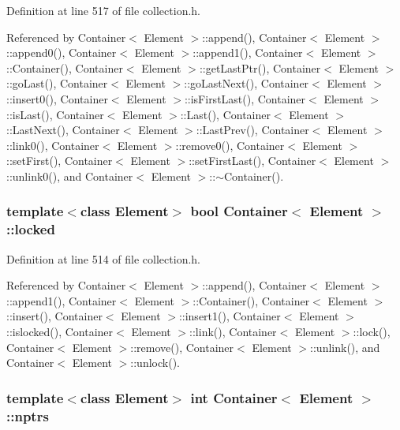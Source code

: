 Definition at line 517 of file collection.h.

Referenced by Container$<$ Element $>$::append(), Container$<$ Element $>$::append0(), Container$<$ Element $>$::append1(), Container$<$ Element $>$::Container(), Container$<$ Element $>$::getLastPtr(), Container$<$ Element $>$::goLast(), Container$<$ Element $>$::goLastNext(), Container$<$ Element $>$::insert0(), Container$<$ Element $>$::isFirstLast(), Container$<$ Element $>$::isLast(), Container$<$ Element $>$::Last(), Container$<$ Element $>$::LastNext(), Container$<$ Element $>$::LastPrev(), Container$<$ Element $>$::link0(), Container$<$ Element $>$::remove0(), Container$<$ Element $>$::setFirst(), Container$<$ Element $>$::setFirstLast(), Container$<$ Element $>$::unlink0(), and Container$<$ Element $>$::$\sim$Container().\hypertarget{classContainer_9f3916a0a0d1ae6385f32feac3d34e19}{
\subsubsection[{locked}]{\setlength{\rightskip}{0pt plus 5cm}template$<$class Element$>$ bool {\bf Container}$<$ Element $>$::{\bf locked}}}
\label{classContainer_9f3916a0a0d1ae6385f32feac3d34e19}




Definition at line 514 of file collection.h.

Referenced by Container$<$ Element $>$::append(), Container$<$ Element $>$::append1(), Container$<$ Element $>$::Container(), Container$<$ Element $>$::insert(), Container$<$ Element $>$::insert1(), Container$<$ Element $>$::islocked(), Container$<$ Element $>$::link(), Container$<$ Element $>$::lock(), Container$<$ Element $>$::remove(), Container$<$ Element $>$::unlink(), and Container$<$ Element $>$::unlock().\hypertarget{classContainer_c74449cb853bdac133c53404726a1e48}{
\subsubsection[{nptrs}]{\setlength{\rightskip}{0pt plus 5cm}template$<$class Element$>$ int {\bf Container}$<$ Element $>$::{\bf nptrs}}}
\label{classContainer_c74449cb853bdac133c53404726a1e48}




